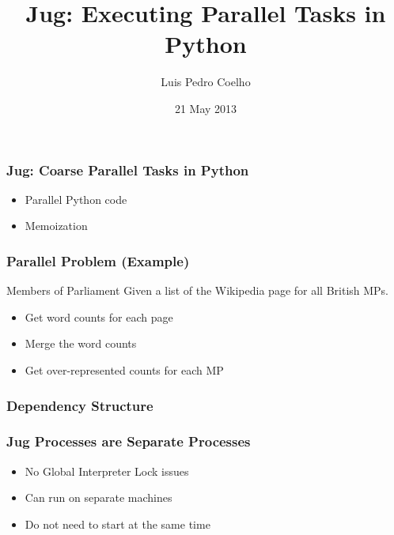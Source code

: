 \documentclass{beamer}
\title[Jug]{Jug: Executing Parallel Tasks in Python}
\author{Luis Pedro Coelho}
\institute{EMLB}
\date{21 May 2013}
\begin{document}
\frame{\titlepage}

\begin{frame}[fragile]
\frametitle{Jug: Coarse Parallel Tasks in Python}

\begin{itemize}
\item Parallel Python code
\item Memoization

\end{itemize}
\end{frame}

\begin{frame}[fragile]
\frametitle{Parallel Problem (Example)}


\begin{block}{Members of Parliament}
Given a list of the Wikipedia page for all British MPs.
\begin{itemize}
\item Get word counts for each page
\item Merge the word counts
\item Get over-represented counts for each MP
\end{itemize}
\end{block}

\end{frame}

\begin{frame}[fragile]
\frametitle{Dependency Structure}

\begin{center}

\end{center}

\end{frame}

\begin{frame}[fragile]
\frametitle{Jug Processes are Separate Processes}
\begin{itemize}
\item \alert{No Global Interpreter Lock} issues
\item Can run on \alert{separate machines}
\item Do not need to start at the same time
\end{itemize}
\end{frame}
\end{document}
